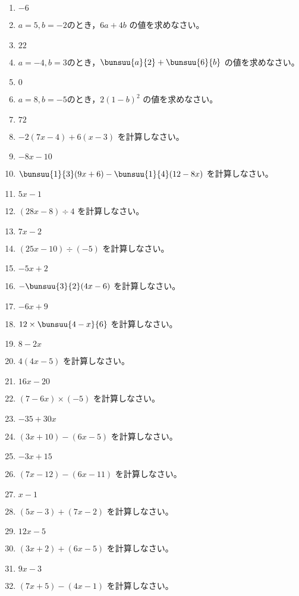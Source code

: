 \documentclass[uplatex,a4j,11pt]{jsreport}
\begin{document}
\begin{multicols}{2}
\begin{enumerate}
    \item $-6$
    \item $a=5, b=-2$のとき，$6a+4b$ の値を求めなさい。%
    \item $22$
    \item $a=-4, b=3$のとき，$\bunsuu{a}{2}+\bunsuu{6}{b}$ の値を求めなさい。%
    \item $0$
    \item $a=8, b=-5$のとき，$2(1-b)^2$ の値を求めなさい。%
    \item $72$
    \item $-2(7x-4)+6(x-3)$ を計算しなさい。%
    \item $-8x-10$
    \item $\bunsuu{1}{3}(9x+6)-\bunsuu{1}{4}(12-8x)$ を計算しなさい。%
    \item $5x-1$
    \item $(28x-8)\div 4$ を計算しなさい。%
    \item $7x-2$
    \item $(25x-10)\div (-5)$ を計算しなさい。%
    \item $-5x+2$
    \item $-\bunsuu{3}{2}(4x-6)$ を計算しなさい。%
    \item $-6x+9$
    \item $12\times \bunsuu{4-x}{6}$ を計算しなさい。%
    \item $8-2x$
    \item $4(4x-5)$ を計算しなさい。%
    \item $16x-20$
    \item $(7-6x)\times (-5)$ を計算しなさい。%
    \item $-35+30x$
    \item $(3x+10)-(6x-5)$ を計算しなさい。%
    \item $-3x+15$
    \item $(7x-12)-(6x-11)$ を計算しなさい。%
    \item $x-1$
    \item $(5x-3)+(7x-2)$ を計算しなさい。%
    \item $12x-5$
    \item $(3x+2)+(6x-5)$ を計算しなさい。%
    \item $9x-3$
    \item $(7x+5)-(4x-1)$ を計算しなさい。%

\end{enumerate}
\end{multicols}
\end{document}
